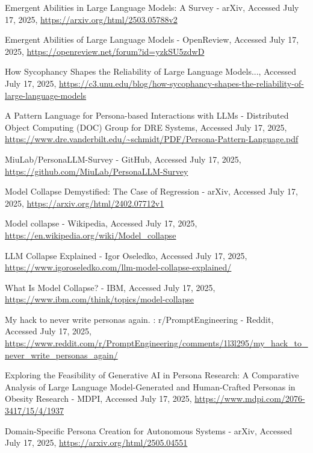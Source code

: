 \documentclass[10pt,twocolumn]{article}
\begin{document}

\begin{thebibliography}{68}

Emergent Abilities in Large Language Models: A Survey - arXiv, Accessed July 17, 2025, \url{https://arxiv.org/html/2503.05788v2}

Emergent Abilities of Large Language Models - OpenReview, Accessed July 17, 2025, \url{https://openreview.net/forum?id=yzkSU5zdwD}

How Sycophancy Shapes the Reliability of Large Language Models..., Accessed July 17, 2025, \url{https://c3.unu.edu/blog/how-sycophancy-shapes-the-reliability-of-large-language-models}

A Pattern Language for Persona-based Interactions with LLMs - Distributed Object Computing (DOC) Group for DRE Systems, Accessed July 17, 2025, \url{https://www.dre.vanderbilt.edu/~schmidt/PDF/Persona-Pattern-Language.pdf}

MiuLab/PersonaLLM-Survey - GitHub, Accessed July 17, 2025, \url{https://github.com/MiuLab/PersonaLLM-Survey}

Model Collapse Demystified: The Case of Regression - arXiv, Accessed July 17, 2025, \url{https://arxiv.org/html/2402.07712v1}

Model collapse - Wikipedia, Accessed July 17, 2025, \url{https://en.wikipedia.org/wiki/Model_collapse}

LLM Collapse Explained - Igor Oseledko, Accessed July 17, 2025, \url{https://www.igoroseledko.com/llm-model-collapse-explained/}

What Is Model Collapse? - IBM, Accessed July 17, 2025, \url{https://www.ibm.com/think/topics/model-collapse}

My hack to never write personas again. : r/PromptEngineering - Reddit, Accessed July 17, 2025, \url{https://www.reddit.com/r/PromptEngineering/comments/1l3l295/my_hack_to_never_write_personas_again/}

Exploring the Feasibility of Generative AI in Persona Research: A Comparative Analysis of Large Language Model-Generated and Human-Crafted Personas in Obesity Research - MDPI, Accessed July 17, 2025, \url{https://www.mdpi.com/2076-3417/15/4/1937}

Domain-Specific Persona Creation for Autonomous Systems - arXiv, Accessed July 17, 2025, \url{https://arxiv.org/html/2505.04551}


\end{thebibliography}
\end{document}
